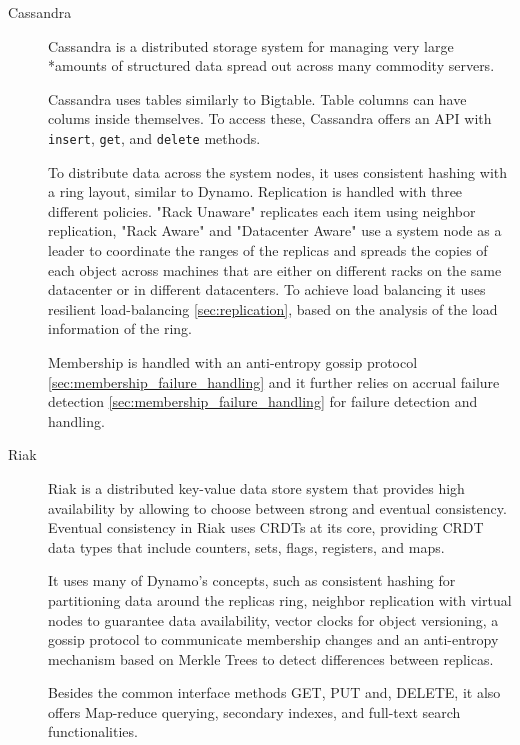 \begin{description}
\item[Cassandra]\cite{cassandra} Cassandra is a distributed storage system for managing very large \\*amounts of structured data spread out across many commodity servers.\par
	Cassandra uses tables similarly to Bigtable. Table columns can have colums inside themselves. To access these, Cassandra offers an API with \verb|insert|, \verb|get|, and \verb|delete| methods.\par
	To distribute data across the system nodes, it uses consistent hashing with a ring layout, similar to Dynamo. Replication is handled with three different policies. "Rack Unaware" replicates each item using neighbor replication, "Rack Aware" and "Datacenter Aware" use a system node as a leader to coordinate the ranges of the replicas and spreads the copies of each object across machines that are either on different racks on the same datacenter or in different datacenters. To achieve load balancing it uses resilient load-balancing \ref{sec:replication}, based on the analysis of the load information of the ring.\par
	Membership is handled with an anti-entropy gossip protocol \ref{sec:membership_failure_handling} and it further relies on accrual failure detection \ref{sec:membership_failure_handling} for failure detection and handling.
	
\item[Riak]\cite{riak_core} Riak is a distributed key-value data store system that provides high availability by allowing to choose between strong and eventual consistency. Eventual consistency in Riak uses CRDTs at its core, providing CRDT data types that include counters, sets, flags, registers, and maps.\par
	It uses many of Dynamo's concepts, such as consistent hashing for partitioning data around the replicas ring, neighbor replication with virtual nodes to guarantee data availability, vector clocks for object versioning, a gossip protocol to communicate membership changes and an anti-entropy mechanism based on Merkle Trees to detect differences between replicas.\par
	Besides the common interface methods GET, PUT and, DELETE, it also offers Map-reduce querying, secondary indexes, and full-text search functionalities.
	

\end{description}
